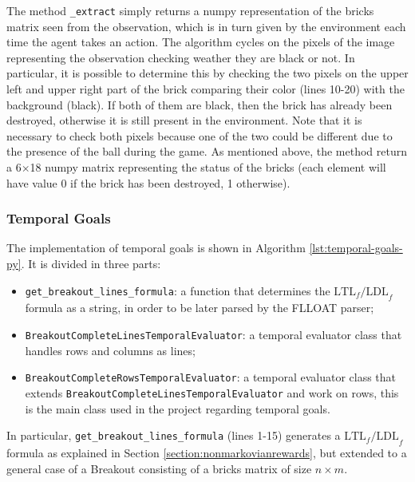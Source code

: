 The method \texttt{\_extract} simply returns a numpy representation of the
bricks matrix seen from the observation, which is in turn given by the environment
each time the agent takes an action. The algorithm cycles on the pixels
of the image representing the observation checking weather they are black
or not. In particular, it is possible to determine this by checking the two
pixels on the upper left and upper right part of the brick comparing their
color (lines 10-20) with the background (black). If both of them are black, then the brick
has already been destroyed, otherwise it is still present in the environment.
Note that it is necessary to check both pixels because one of the two could
be different due to the presence of the ball during the game. As mentioned
above, the method return a 6$\times$18 numpy matrix representing the status of
the bricks (each element will have value 0 if the brick has been destroyed,
1 otherwise).


\subsubsection{Temporal Goals}
The implementation of temporal goals is shown in Algorithm
\ref{lst:temporal-goals-py}. It is divided in three parts:
\begin{itemize}
    \item \texttt{get_breakout_lines_formula}: a function that determines the
        $\text{LTL}_f\text{/LDL}_f$ formula as a string, in order to be
        later parsed by the FLLOAT parser;
    \item \texttt{BreakoutCompleteLinesTemporalEvaluator}: a
        temporal evaluator class that handles rows and columns as lines;
    \item \texttt{BreakoutCompleteRowsTemporalEvaluator}: a temporal evaluator
        class that extends \texttt{BreakoutCompleteLinesTemporalEvaluator} and
        work on rows, this is the main class used in the project regarding
        temporal goals.
\end{itemize}

In particular, \texttt{get_breakout_lines_formula} (lines 1-15) generates a
$\text{LTL}_f\text{/LDL}_f$ formula as explained in Section
\ref{section:nonmarkovianrewards}, but extended to a general case of a Breakout
consisting of a bricks matrix of size $n \times m$.

